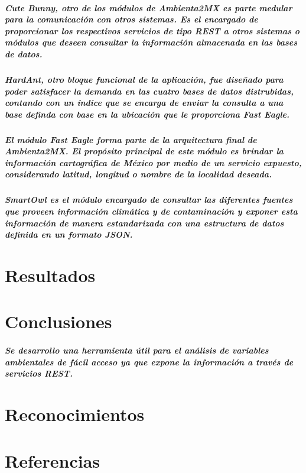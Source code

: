 \documentclass[12pt]{report}
\begin{document}
  \paragraph{Cute Bunny, otro de los módulos de Ambienta2MX es parte medular para la comunicación con otros sistemas. Es el encargado de proporcionar los respectivos servicios de tipo REST a otros sistemas o módulos que deseen consultar la información almacenada en las bases de datos.}

  \paragraph{HardAnt, otro bloque funcional de la aplicación, fue diseñado para poder satisfacer la demanda en las cuatro bases de datos distrubidas, contando con un índice que se encarga de enviar la consulta a una base definda con base en la ubicación que le proporciona Fast Eagle.}

  \paragraph{El módulo Fast Eagle forma parte de la arquitectura final de Ambienta2MX. El propósito principal de este módulo es brindar la información cartográfica de México por medio de un servicio expuesto, considerando latitud, longitud o nombre de la localidad deseada.}

  \paragraph{SmartOwl es el módulo encargado de consultar las diferentes fuentes que proveen información climática y de contaminación y exponer esta información de manera estandarizada con una estructura de datos definida en un formato JSON.}

\chapter{Resultados}
    
\chapter{Conclusiones}
  \paragraph{Se desarrollo una herramienta útil para el análisis de variables ambientales de fácil acceso ya que expone la información a través de servicios REST. \\}

\chapter{Reconocimientos}
  \paragraph{}

\chapter{Referencias}
\end{document}
